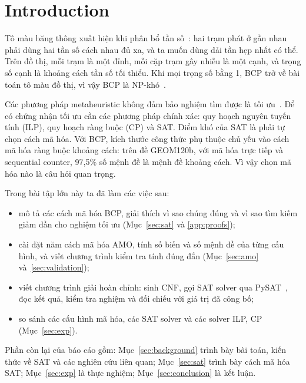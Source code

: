 \section{Introduction}\label{sec:intro}

Tô màu băng thông xuất hiện khi phân bổ tần số~\citep{nguyen2026bcp}: hai trạm phát ở gần nhau phải dùng hai tần số cách nhau đủ xa, và ta muốn dùng dải tần hẹp nhất có thể. Trên đồ thị, mỗi trạm là một đỉnh, mỗi cặp trạm gây nhiễu là một cạnh, và trọng số cạnh là khoảng cách tần số tối thiểu. Khi mọi trọng số bằng 1, BCP trở về bài toán tô màu đồ thị, vì vậy BCP là NP-khó~\citep{nguyen2026bcp}.

Các phương pháp metaheuristic không đảm bảo nghiệm tìm được là tối ưu~\citep{nguyen2026bcp}. Để có chứng nhận tối ưu cần các phương pháp chính xác: quy hoạch nguyên tuyến tính (ILP), quy hoạch ràng buộc (CP) và SAT. Điểm khó của SAT là phải tự chọn cách mã hóa. Với BCP, kích thước công thức phụ thuộc chủ yếu vào cách mã hóa ràng buộc khoảng cách: trên đề GEOM120b, với mã hóa trực tiếp và sequential counter, 97,5\% số mệnh đề là mệnh đề khoảng cách. Vì vậy chọn mã hóa nào là câu hỏi quan trọng.

Trong bài tập lớn này ta đã làm các việc sau:
\begin{itemize}
\item mô tả các cách mã hóa BCP, giải thích vì sao chúng đúng và vì sao tìm kiếm giảm dần cho nghiệm tối ưu (Mục~\ref{sec:sat} và \ref{app:proofs});
\item cài đặt năm cách mã hóa AMO, tính số biến và số mệnh đề của từng cấu hình, và viết chương trình kiểm tra tính đúng đắn (Mục~\ref{sec:amo} và~\ref{sec:validation});
\item viết chương trình giải hoàn chỉnh: sinh CNF, gọi SAT solver qua PySAT~\citep{ignatiev2018}, đọc kết quả, kiểm tra nghiệm và đối chiếu với giá trị đã công bố;
\item so sánh các cấu hình mã hóa, các SAT solver và các solver ILP, CP \DataScope{} (Mục~\ref{sec:exp}).
\end{itemize}

Phần còn lại của báo cáo gồm: Mục~\ref{sec:background} trình bày bài toán, kiến thức về SAT và các nghiên cứu liên quan; Mục~\ref{sec:sat} trình bày cách mã hóa SAT; Mục~\ref{sec:exp} là thực nghiệm; Mục~\ref{sec:conclusion} là kết luận.
